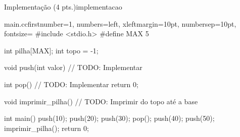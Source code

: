 \begin{problem}{Implementação (4 pts.)}{implementacao}
\begin{mylisting}[enhanced]{main.c}{c}{firstnumber=1, numbers=left, xleftmargin=10pt, numbersep=10pt, fontsize=\small}
#include <stdio.h>
#define MAX 5

int pilha[MAX];
int topo = -1;

void push(int valor) {
    // TODO: Implementar
}

int pop() {
    // TODO: Implementar
    return 0;
}

void imprimir_pilha() {
    // TODO: Imprimir do topo até a base
}

int main() {
    push(10);
    push(20);
    push(30);
    pop();
    push(40);
    push(50);
    imprimir_pilha();
    return 0;
}
\end{mylisting}

\end{problem}
    
\newpage

\vfill
\printbibliography





